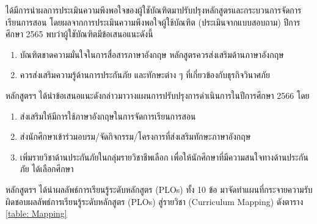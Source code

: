 \begin{doclist}
\end{doclist}



\printprogram{} ได้มีการนำผลการประเมินความพึงพอใจของผู้ใชับัณฑิตมาปรับปรุงหลักสูตรและกระบวนการจัดการเรียนการสอน โดยผลจากการประเมินความพึงพอใจผู้ใช้บัณฑิต (ประเมินจากแบบสอบถาม) ปีการศึกษา 2565 พบว่าผู้ใชับัณฑิตมีข้อเสนอแนะดังนี้
\begin{enumerate}
	\item บัณฑิตขาดความมั่นใจในการสื่อสารภาษาอังกฤษ หลักสูตรควรส่งเสริมด้านภาษาอังกฤษ
	\item ควรส่งเสริมความรู้ด้านการประกันภัย และทักษะต่าง ๆ ที่เกี่ยวข้องกับธุรกิจวินาศภัย
\end{enumerate}
หลักสูตรฯ ได้นำข้อเสนอแนะดังกล่าวมาวางแผนการปรับปรุงการดำเนินการในปีการศึกษา 2566 โดย
\begin{enumerate}
\item ส่งเสริมให้มีการใช้ภาษาอังกฤษในการจัดการเรียนการสอน
\item ส่งนักศึกษาเข้าร่วมอบรม/จัดกิจกรรม/โครงการที่ส่งเสริมทักษะภาษาอังกฤษ
\item เพิ่มรายวิชาด้านประกันภัยในกลุ่มรายวิชาชีพเลือก เพื่อให้นักศึกษาที่มีความสนใจทางด้านประกันภัย ได้เลือกศึกษา
\end{enumerate}


\begin{doclist}
\end{doclist}


หลักสูตรฯ ได้นำผลลัพธ์การเรียนรู้ระดับหลักสูตร (PLOs) ทั้ง 10 ข้อ มาจัดทำแผนที่กระจายความรับผิดชอบผลลัพธ์การเรียนรู้ระดับหลักสูตร (PLOs) สู่รายวิชา (Curriculum Mapping) ดังตาราง \ref{table: Mapping}

